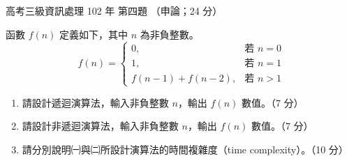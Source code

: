 \begin{pastexam}[label={px:gk3-102-ds-04}]{高考三級資訊處理 102 年 第四題}
（申論；24 分）

函數 $f(n)$ 定義如下，其中 $n$ 為非負整數。
\[
f(n) = \begin{cases}
0, & \text{若 } n = 0 \\
1, & \text{若 } n = 1 \\
f(n-1) + f(n-2), & \text{若 } n > 1
\end{cases}
\]
\begin{enumerate}[leftmargin=2.6em, labelsep=0.4em]
\item[㈠] 請設計遞迴演算法，輸入非負整數 $n$，輸出 $f(n)$ 數值。（7 分）
\item[㈡] 請設計非遞迴演算法，輸入非負整數 $n$，輸出 $f(n)$ 數值。（7 分）
\item[㈢] 請分別說明㈠與㈡所設計演算法的時間複雜度（time complexity）。（10 分）
\end{enumerate}
\end{pastexam}

